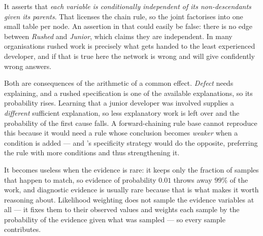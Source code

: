 \begin{ans}
  \item It asserts that \emph{each variable is conditionally independent of its
        non-descendants given its parents}. That licenses the chain rule, so the
        joint factorises into one small table per node. An assertion in
         that could easily be false: there is no edge between
        \emph{Rushed} and \emph{Junior}, which claims they are independent. In many
        organisations rushed work is precisely what gets handed to the least
        experienced developer, and if that is true here the network is wrong and
        will give confidently wrong answers.
  \item Both are consequences of the arithmetic of a common effect.
        \emph{Defect} needs explaining, and a rushed specification is one of the
        available explanations, so its probability rises. Learning that a junior
        developer was involved supplies a \emph{different} sufficient explanation,
        so less explanatory work is left over and the probability of the first cause
        falls. A forward-chaining rule base cannot reproduce this because it would
        need a rule whose conclusion becomes \emph{weaker} when a condition is
        added --- and 's specificity strategy would do the opposite,
        preferring the rule with more conditions and thus strengthening it.
  \item It becomes useless when the evidence is rare: it keeps only the fraction of
        samples that happen to match, so evidence of probability $0.01$ throws away
        $99\%$ of the work, and diagnostic evidence is usually rare because that is
        what makes it worth reasoning about. Likelihood weighting does not sample
        the evidence variables at all --- it fixes them to their observed values and
        weights each sample by the probability of the evidence given what was
        sampled --- so every sample contributes.
\end{ans}


